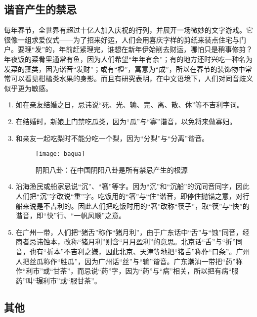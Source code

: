 \subsection{谐音产生的禁忌}

    每年春节，全世界有超过十亿人加入庆祝的行列，并展开一场微妙的文字游戏。它很像一组求爱仪式——为了招来好运，人们会用喜庆字样的剪纸来装点住宅与门户。要理“发”的，年前赶紧理完，谁想在新年伊始削去财运，哪怕只是稍事修剪？年夜饭的菜肴里通常有鱼，因为人们希望“年年有余”；有的地方还时兴吃一种名为发菜的藻类，因为谐音“发财”；或有“橙”，寓意为“成”，所以在春节的装饰物中常常可以看见柑橘类水果的身影。而且有研究表明，在中文语境下，人们对同音歧义似乎更为敏感。
    \begin{enumerate}
    \item 
   如在亲友结婚之日，忌讳说“死、光、输、完、离、散、休”等不吉利字词。
   \item 
   在结婚时，新娘上门禁吃瓜类，因为“瓜”与“寡”谐音，以免将来做寡妇。
   \item 
   和亲友一起吃梨时不能分吃一个梨，因为“分梨”与“分离”谐音。
   \begin{figure}[htb]
    \centering
    \texttt{[image: bagua]}
    \caption{阴阳八卦：在中国阴阳八卦是所有禁忌产生的根源}
    
    \end{figure}

     
    

   \item 
   沿海渔民或船家忌说“沉”、“箸”等字。因为“沉”和“沉船”的沉同音同字，因此人们把“沉”字改说“重”字。吃饭用的“箸”与“住”谐音，即停住抛锚之意，对行船来说是不吉利的。因此人们把吃饭时用的“箸”改称“筷子”，取“筷”与“快”的谐音，即“快”行、“一帆风顺”之意。
   \item 
   在广州一带，人们把“猪舌”称作“猪月利”，由于广东话中“舌”与“蚀”同音，经商者忌讳蚀本，改称“猪月利”则含“月月盈利”的意思。北京话“舌”与“折”同音，也有“折本”不吉利之嫌，因此北京、天津等地把“猪舌”称作“口条”。广州人把丝瓜称作“胜瓜”，因为广州话“丝”与“输”谐音。广东潮汕一带把“药”称作“利市”或“甘茶”，而忌说“药”字，因为“药”与“病”相关，所以把有病“服药”叫“辗利市”或“服甘茶”。
        
    \end{enumerate}

\subsection{其他}

